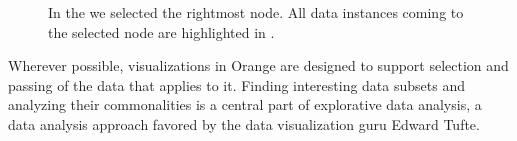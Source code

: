 \begin{figure}[h]
  \caption{In the  we selected the rightmost node. All data instances coming to the selected node are highlighted in .}
\end{figure}

Wherever possible, visualizations in Orange are designed to support selection and passing of the data that applies to it. Finding interesting data subsets and analyzing their commonalities is a central part of explorative data analysis, a data analysis approach favored by the data visualization guru Edward Tufte.